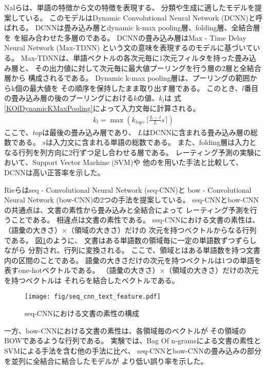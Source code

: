 Nalら\cite{nal14}は、単語の特徴から文の特徴を表現する、
分類や生成に適したモデルを提案している。
このモデルはDynamic Convolutional Neural Network (DCNN)と呼ばれる。
DCNNは畳み込み層とdynamic k-max pooling層、folding層、全結合層を
を組み合わせた多層の\nn である。
DCNNの畳み込み層はMax - Time Delay Neural Network (Max-TDNN)\cite{ronan08}
という文の意味を表現する\nn のモデルに基づいている。
Max-TDNNは、単語ベクトルの各次元毎に1次元フィルタを持った畳み込み層と、
その出力値に対して次元毎に最大値プーリングを行う層の2層と全結合層から
構成される\nn である。
Dynamic k-max pooling層は、プーリングの範囲からk個の最大値を
その順序を保持したまま取り出す層である。
このとき、$l$番目の畳み込み層の後のプーリングにおける$k$の値、$k_l$は
式\ref{KOfDynamicKMaxPooling}によって入力文毎に計算される。
\begin{gather} \label{KOfDynamicKMaxPooling}
  k_l = \max \left( k_{top}, \lceil \frac{L - l}{L}s \rceil \right)
\end{gather}
ここで、$top$は最後の畳み込み層であり、
$L$はDCNNに含まれる畳み込み層の総数である。
$s$は入力文に含まれる単語の総数である。
また、folding層は入力となる行列を列方向に2行ずつ足し合わせる層である。
レーティング予測の実験において、Support Vector Machine (SVM)や
他の\nn を用いた手法と比較して、DCNNは高い正答率を示した。

Rieら\cite{rie14}はseq - Convolutional Neural Network (seq-CNN)と
bow - Convolutional Neural Network (bow-CNN)の2つの手法を提案している。
seq-CNNとbow-CNNの共通点は、文書の素性から畳み込み\nn と全結合\nn によって
レーティング予測を行うことである。
相違点は文書の素性である。
seq-CNNにおける文書の素性は、（語彙の大きさ）×（領域の大きさ）だけの
次元を持つベクトルからなる行列である。
図\ref{fig:SeqCNNTextFeature}のように、
文書はある単語数の領域毎に一定の単語数ずつずらしながら
分割され、行列に変換される。
ここで、領域とはある単語数を持つ文書内の区間のことである。
語彙の大きさだけの次元を持つベクトルは1つの単語を表すone-hotベクトルである。
（語彙の大きさ）×（領域の大きさ）だけの次元を持つベクトルは
それらを結合したベクトルである。
\begin{figure}
  \texttt{[image: fig/seq\_cnn\_text\_feature.pdf]}
  \caption{seq-CNNにおける文書の素性の構成}
  \label{fig:SeqCNNTextFeature}
\end{figure}
一方、bow-CNNにおける文書の素性は、各領域毎のベクトルが
その領域のBOWであるような行列である。
実験では、Bag Of n-gramsによる文書の素性とSVMによる手法を含む他の手法に比べ、
seq-CNNとbow-CNNの畳み込み\nn の部分を並列に全結合\nn に結合したモデルが
より低い誤り率を示した。

